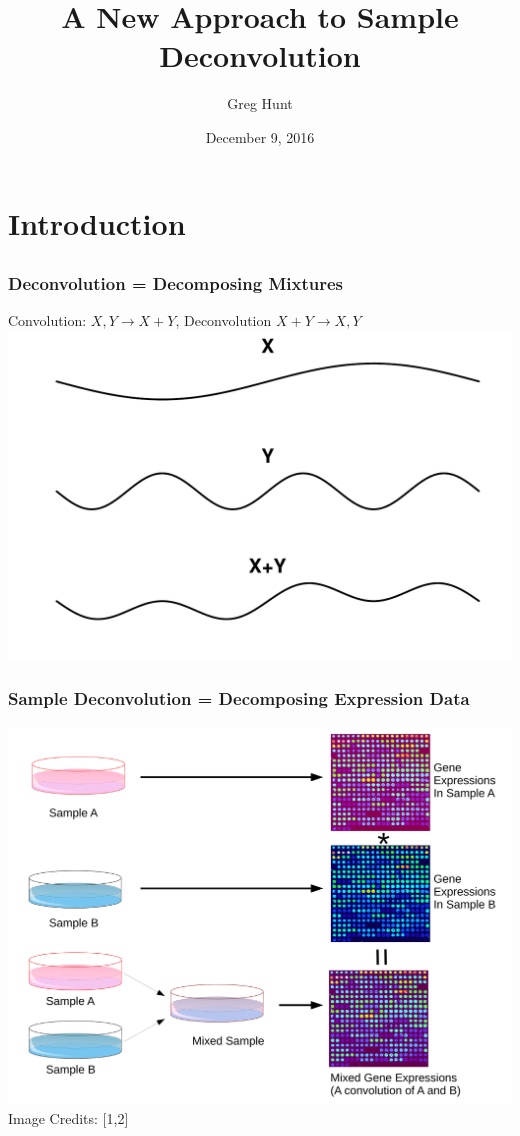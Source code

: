 \documentclass{beamer}
\title{A New Approach to Sample Deconvolution}
\author{Greg Hunt}
\institute{University of Michigan}
\date{December 9, 2016}
\begin{document}
\section{Introduction}
\subsection{}

\begin{frame}
\titlepage
\end{frame}

\begin{frame}
  \frametitle{Deconvolution = Decomposing Mixtures}
  \begin{center}
    {\color{blue}Convolution: $X,Y \rightarrow X+Y$, \quad Deconvolution $X+Y \rightarrow X,Y$}
  \includegraphics[scale=.4]{sigconv.pdf}
  \end{center}
\end{frame}

\begin{frame}
  \frametitle{Sample Deconvolution = Decomposing Expression Data}
  \begin{center}
    \includegraphics[scale=.3]{slide_conv.pdf}
      {\tiny Image Credits: [1,2]}
  \end{center}
\end{frame}
\end{document}

